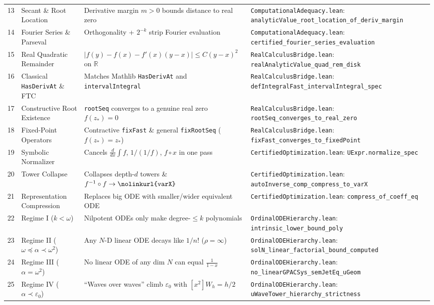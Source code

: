 \documentclass[11pt,a4paper]{article}
\newcommand{\R}{\ensuremath{\mathbb{R}}}
\newcommand{\lean}[1]{\texttt{\nolinkurl{#1}}}
\begin{document}
\begin{center}
\begin{tabular}{@{}p{0.5cm}>{\raggedright\arraybackslash}p{3.9cm}>{\raggedright\arraybackslash}p{4.8cm}>{\raggedright\arraybackslash}p{5.5cm}@{}}
13 & Secant \& Root Location & Derivative margin $m>0$ bounds distance to real zero & \lean{ComputationalAdequacy.lean}: \lean{analyticValue_root_location_of_deriv_margin} \\
14 & Fourier Series \& Parseval & Orthogonality + $2^{-k}$ strip Fourier evaluation & \lean{ComputationalAdequacy.lean}: \lean{certified_fourier_series_evaluation} \\
15 & Real Quadratic Remainder & $|f(y)-f(x)-f'(x)(y-x)| \le C(y-x)^2$ on $\R$ & \lean{RealCalculusBridge.lean}: \lean{realAnalyticValue_quad_rem_disk} \\
16 & Classical \lean{HasDerivAt} \& FTC & Matches Mathlib \lean{HasDerivAt} and \lean{intervalIntegral} & \lean{RealCalculusBridge.lean}: \lean{defIntegralFast_intervalIntegral_spec} \\
17 & Constructive Root Existence & \lean{rootSeq} converges to a genuine real zero $f(z_*)=0$ & \lean{RealCalculusBridge.lean}: \lean{rootSeq_converges_to_real_zero} \\
18 & Fixed-Point Operators & Contractive \lean{fixFast} \& general \lean{fixRootSeq} ($f(z_*)=z_*$) & \lean{RealCalculusBridge.lean}: \lean{fixFast_converges_to_fixedPoint} \\
19 & Symbolic Normalizer & Cancels $\frac{d}{dx}\int f$, $1/(1/f)$, $f \circ x$ in one pass & \lean{CertifiedOptimization.lean}: \lean{UExpr.normalize_spec} \\
20 & Tower Collapse & Collapses depth-$d$ towers \& $f^{-1}\circ f \to \lean{varX}$ & \lean{CertifiedOptimization.lean}: \lean{autoInverse_comp_compress_to_varX} \\
21 & Representation Compression & Replaces big ODE with smaller/wider equivalent ODE & \lean{CertifiedOptimization.lean}: \lean{compress_of_coeff_eq} \\
22 & Regime I ($k < \omega$) & Nilpotent ODEs only make degree-$\le k$ polynomials & \lean{OrdinalODEHierarchy.lean}: \lean{intrinsic_lower_bound_poly} \\
23 & Regime II ($\omega \preceq \alpha \prec \omega^2$) & Any $N$-D linear ODE decays like $1/n!$ ($\rho = \infty$) & \lean{OrdinalODEHierarchy.lean}: \lean{solN_linear_factorial_bound_computed} \\
24 & Regime III ($\alpha = \omega^2$) & No linear ODE of any dim $N$ can equal $\frac{1}{1-x}$ & \lean{OrdinalODEHierarchy.lean}: \lean{no_linearGPACSys_semJetEq_uGeom} \\
25 & Regime IV ($\alpha \prec \varepsilon_0$) & ``Waves over waves'' climb $\varepsilon_0$ with $[x^2]W_h = h/2$ & \lean{OrdinalODEHierarchy.lean}: \lean{uWaveTower_hierarchy_strictness} \\

\end{tabular}
\end{center}
\end{document}
